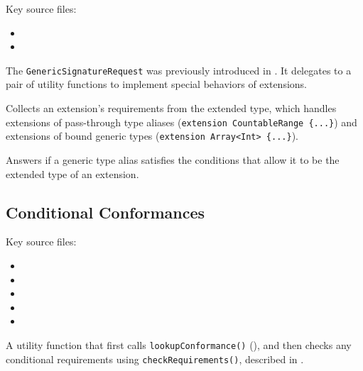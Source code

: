 \documentclass[../generics]{subfiles}
\begin{document}
Key source files:
\begin{itemize}
\item {}
\item {}
\end{itemize}
The \texttt{GenericSignatureRequest} was previously introduced in . It delegates to a pair of utility functions to implement special behaviors of extensions.

Collects an extension's requirements from the extended type, which handles extensions of pass-through type aliases (\verb|extension CountableRange {...}|) and extensions of bound generic types (\verb|extension Array<Int> {...}|).

Answers if a generic type alias satisfies the conditions that allow it to be the extended type of an extension.

\subsection*{Conditional Conformances}

Key source files:
\begin{itemize}
\item {}
\item {}
\item {}
\item {}
\item {}
\end{itemize}

A utility function that first calls \texttt{lookupConformance()} (), and then checks any conditional requirements using \texttt{checkRequirements()}, described in .
\end{document}

